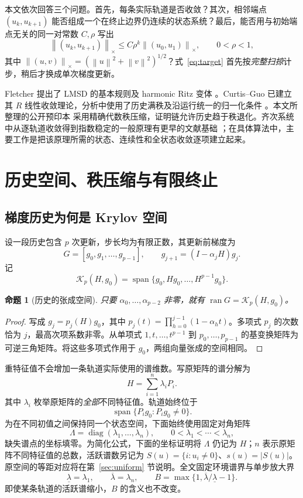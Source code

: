 \documentclass[UTF8,zihao=-4,a4paper]{ctexart}
\newtheorem{proposition}[theorem]{命题}
\theoremstyle{definition}\newtheorem{example}[theorem]{例}
\newcommand{\norm}[1]{\left\lVert#1\right\rVert}
\newcommand{\K}{\mathcal K}\newcommand{\I}{\mathcal I}
\DeclareMathOperator{\diag}{diag}\DeclareMathOperator{\Span}{span}\DeclareMathOperator{\rank}{rank}
\begin{document}
本文依次回答三个问题。首先，每条实际轨道是否收敛？其次，相邻端点 $(u_k,u_{k+1})$ 能否组成一个在终止边界仍连续的状态系统？最后，能否用与初始端点无关的同一对常数 $C,\rho$ 写出
\begin{equation}\label{eq:target}
 \norm{(u_k,u_{k+1})}_\times
 \le C\rho^k\norm{(u_0,u_1)}_\times,
 \qquad 0<\rho<1,
\end{equation}
其中 $\norm{(u,v)}_\times=(\norm u^2+\norm v^2)^{1/2}$？式~\eqref{eq:target} 首先按\emph{完整扫掠}计步，稍后才换成单次梯度更新。

Fletcher 提出了 LMSD 的基本规则及 harmonic Ritz 变体 \cite{Fletcher}。Curtis--Guo 已建立其 $R$ 线性收敛理论，分析中使用了历史满秩及沿运行统一的归一化条件 \cite{CurtisGuo}。本文所整理的公开预印本 \cite{YY2026} 采用精确代数秩压缩，证明链允许历史趋于秩退化。齐次系统中从逐轨道收敛得到指数稳定的一般原理有更早的文献基础 \cite{ShenHu}；在具体算法中，主要工作是把该原理所需的状态、连续性和全状态收敛逐项建立起来。

\section{历史空间、秩压缩与有限终止}

\subsection{梯度历史为何是 Krylov 空间}

设一段历史包含 $p$ 次更新，步长均为有限正数，其更新前梯度为
\[
 G=[g_0,g_1,\ldots,g_{p-1}],\qquad
 g_{j+1}=(I-\alpha_jH)g_j.
\]
记
\[
 \K_p(H,g_0)=\Span\{g_0,Hg_0,\ldots,H^{p-1}g_0\}.
\]
\begin{proposition}[历史的张成空间]\label{prop:history}
只要 $\alpha_0,\ldots,\alpha_{p-2}$ 非零，就有
$\operatorname{ran}G=\K_p(H,g_0)$。
\end{proposition}
\begin{proof}
写成 $g_j=p_j(H)g_0$，其中
$p_j(t)=\prod_{h=0}^{j-1}(1-\alpha_ht)$。多项式 $p_j$ 的次数恰为 $j$，最高次项系数非零。从单项式 $1,t,\ldots,t^{p-1}$ 到 $p_0,\ldots,p_{p-1}$ 的基变换矩阵为可逆三角矩阵。将这些多项式作用于 $g_0$，两组向量张成的空间相同。
\end{proof}

重特征值不会增加一条轨道实际使用的谱维数。写原矩阵的谱分解为
\[H=\sum_{i=1}^n\lambda_iP_i.\]其中 $\lambda_i$ 枚举原矩阵的\emph{全部}不同特征值。轨道始终位于
\[\Span\{P_i g_0:P_i g_0\ne0\}.\]为在不同初值之间保持同一个状态空间，下面始终使用固定对角矩阵
\begin{equation}\label{eq:simple}
 \Lambda=\diag(\lambda_1,\ldots,\lambda_n),\qquad
 0<\lambda_1<\cdots<\lambda_n,
\end{equation}
缺失谱点的坐标填零。为简化公式，下面的坐标证明将 $\Lambda$ 仍记为 $H$；$n$ 表示原矩阵不同特征值的总数，活跃谱数另记为
$S(u)=\{i:u_i\ne0\}$、$s(u)=|S(u)|$。原空间的等距对应将在第~\ref{sec:uniform} 节说明。全文固定环境谱界与单步放大界\[\underline\lambda=\lambda_1,\qquad\overline\lambda=\lambda_n,\qquad B=\max\{1,\overline\lambda/\underline\lambda-1\}.\]即使某条轨道的活跃谱缩小，$B$ 的含义也不改变。
\end{document}
